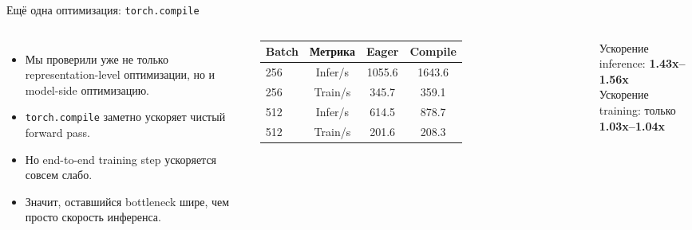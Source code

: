 \documentclass[aspectratio=169]{beamer}
\begin{document}
\begin{frame}{Ещё одна оптимизация: \texttt{torch.compile}}
  \begin{columns}[T]
    \begin{itemize}
      \item Мы проверили уже не только representation-level оптимизации, но и model-side оптимизацию.
      \item \texttt{torch.compile} заметно ускоряет чистый forward pass.
      \item Но end-to-end training step ускоряется совсем слабо.
      \item Значит, оставшийся bottleneck шире, чем просто скорость инференса.
    \end{itemize}

    \centering
    \begin{tabular}{@{}lccc@{}}
      \toprule
      Batch & Метрика & Eager & Compile \\
      \midrule
      256 & Infer/s & 1055.6 & 1643.6 \\
      256 & Train/s & 345.7 & 359.1 \\
      512 & Infer/s & 614.5 & 878.7 \\
      512 & Train/s & 201.6 & 208.3 \\
      \bottomrule
    \end{tabular}

    \vspace{0.5em}
    \small
    Ускорение inference: \textbf{1.43x--1.56x}\\
    Ускорение training: только \textbf{1.03x--1.04x}
  \end{columns}
\end{frame}
\end{document}
